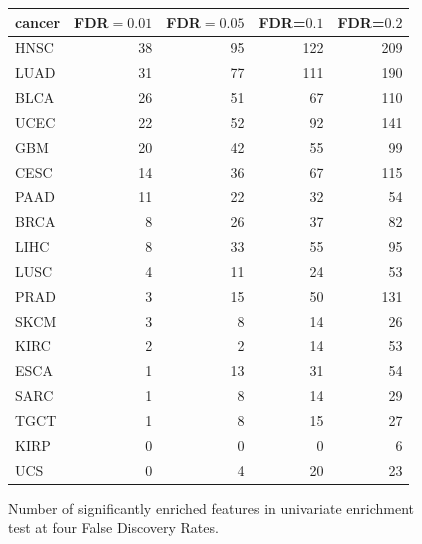 \begin{figure}
  \centering
  \begin{tabular}{l|r|r|r|r}
\hline
cancer & FDR$=0.01$ & FDR$=0.05$ & FDR=$0.1$ & FDR=$0.2$ \\
\hline
HNSC & 38 & 95 & 122 & 209\\

LUAD & 31 & 77 & 111 & 190\\

BLCA & 26 & 51 & 67 & 110\\

UCEC & 22 & 52 & 92 & 141\\

GBM & 20 & 42 & 55 & 99\\

CESC & 14 & 36 & 67 & 115\\

PAAD & 11 & 22 & 32 & 54\\

BRCA & 8 & 26 & 37 & 82\\

LIHC & 8 & 33 & 55 & 95\\

LUSC & 4 & 11 & 24 & 53\\

PRAD & 3 & 15 & 50 & 131\\

SKCM & 3 & 8 & 14 & 26\\

KIRC & 2 & 2 & 14 & 53\\

ESCA & 1 & 13 & 31 & 54\\

SARC & 1 & 8 & 14 & 29\\

TGCT & 1 & 8 & 15 & 27\\

KIRP & 0 & 0 & 0 & 6\\

UCS & 0 & 4 & 20 & 23\\

  \end{tabular}
\label{tab:univariateFDR}
\caption{Number of significantly enriched features in univariate enrichment test at four False Discovery Rates.  }
\end{figure}


